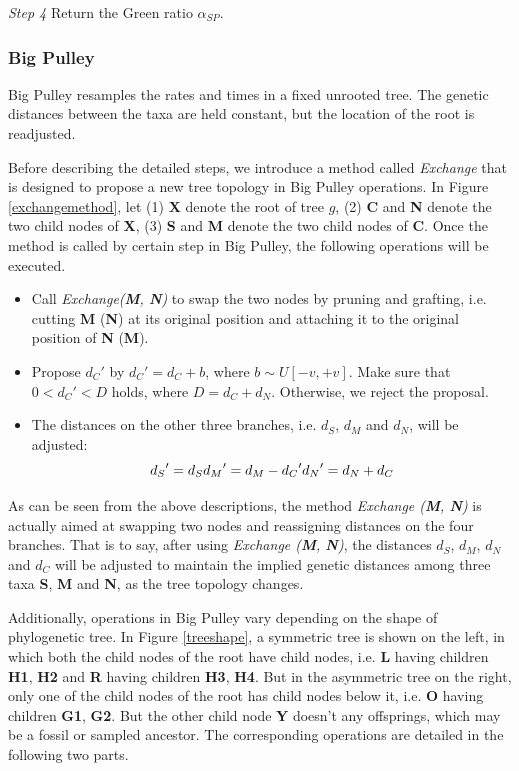 \documentclass{bmcart}
\begin{document}
\emph{Step 4} Return the Green ratio ${\alpha_{SP}}$.
\subsubsection*{Big Pulley}
Big Pulley resamples the rates and times in a fixed unrooted tree. The genetic distances between the taxa are held constant, but the location of the root is readjusted.

Before describing the detailed steps, we introduce a method called \textit{Exchange} that is designed to propose a new tree topology in Big Pulley operations. In Figure \ref{exchangemethod}, let (1) \textbf{X} denote the root of tree $g$, (2) \textbf{C} and \textbf{N} denote the two child nodes of \textbf{X}, (3) \textbf{S} and \textbf{M} denote the two child nodes of \textbf{C}. Once the method is called by certain step in Big Pulley, the following operations will be executed.
\begin{itemize}
\item Call \textit{Exchange(\textbf{M}, \textbf{N})} to swap the two nodes by pruning and grafting, i.e. cutting \textbf{M} (\textbf{N}) at its original position and attaching it to the original position of \textbf{N} (\textbf{M}).
\item Propose ${d_C}'$ by ${d_C}' = {d_C} + b$, where $b \sim U[ - v, + v]$. Make sure that $0 < {d_C}' < D$ holds, where $D = {d_C} + {d_{N}}$. Otherwise, we reject the proposal.
\item The distances on the other three branches, i.e. $d_S$, $d_{M}$ and $d_{N}$, will be adjusted:
\begin{equation}\label{big_dis}
{d_S}' = {d_S}\\
{d_{M}}' = {d_{M}} - {d_C}'\\
{d_{N}}' = {d_{N}} + {d_C}
\end{equation}
\end{itemize}

As can be seen from the above descriptions, the method \textit{Exchange (\textbf{M}, \textbf{N})} is actually aimed at swapping two nodes and reassigning distances on the four branches. That is to say, after using \textit{Exchange (\textbf{M}, \textbf{N})}, the distances $d_S$, $d_{M}$, $d_{N}$ and $d_{C}$ will be adjusted to maintain the implied genetic distances among three taxa \textbf{S}, \textbf{M} and \textbf{N}, as the tree topology changes.

Additionally, operations in Big Pulley vary depending on the shape of phylogenetic tree. In Figure \ref{treeshape}, a symmetric tree is shown on the left, in which both the child nodes of the root have child nodes, i.e. \textbf{L} having children \textbf{H1}, \textbf{H2} and \textbf{R} having children \textbf{H3}, \textbf{H4}. But in the asymmetric tree on the right, only one of the child nodes of the root has child nodes below it, i.e. \textbf{O} having children \textbf{G1}, \textbf{G2}. But the other child node \textbf{Y} doesn't any offsprings, which may be a fossil or sampled ancestor. The corresponding operations are detailed in the following two parts.
\end{document}
